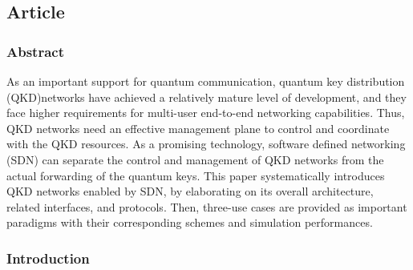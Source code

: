 \subsection{Article}

\subsubsection*{Abstract}

As an important support for quantum communication, quantum key distribution (QKD)networks have achieved a relatively mature level of development, and they face higher requirements for multi-user end-to-end networking capabilities. Thus, QKD networks need an effective management plane to control and coordinate with the QKD resources. As a promising technology, software defined networking (SDN) can separate the control and management of QKD networks from the actual forwarding of the quantum keys. This paper systematically introduces QKD networks enabled by SDN, by elaborating on its overall architecture, related interfaces, and protocols. Then, three-use cases are provided as important paradigms with their corresponding schemes and simulation performances.

\subsubsection{Introduction}

